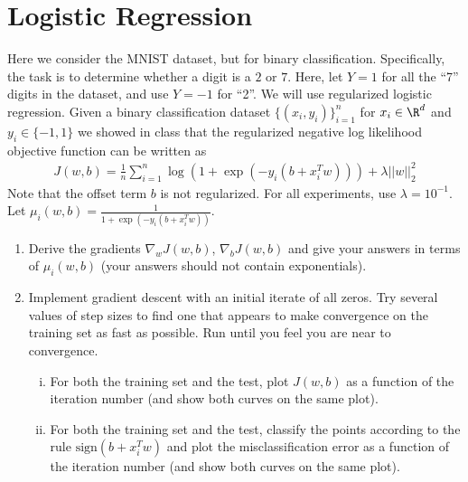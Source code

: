 \documentclass{article}
\begin{document}
\newpage

\section*{Logistic Regression}

\begin{aprob}
    Here we consider the MNIST dataset, but for binary classification. Specifically, the task is to determine whether a digit is a $2$ or $7$.
    Here, let $Y=1$ for all the ``7'' digits in the dataset, and use $Y=-1$ for ``2''.
    We will use regularized logistic regression. 
    Given a binary classification dataset $\{(x_i,y_i)\}_{i=1}^n$ for $x_i \in \R^d$ and $y_i \in \{-1,1\}$ we showed in class that the regularized negative log likelihood objective function can be written as
    \begin{align*}
    J(w,b) = \frac{1}{n} \sum_{i=1}^n \log( 1 + \exp(-y_i (b + x_i^T w))) + \lambda ||w||_2^2
    \end{align*} 
    Note that the offset term $b$ is not regularized. 
    For all experiments, use $\lambda = 10^{-1}$. 
    Let $\mu_i(w,b) = \frac{1}{1+ \exp(-y_i (b + x_i^T w))}$. 
    \begin{enumerate}
        \item {} Derive the gradients $\nabla_w J(w,b)$, $\nabla_{b} J(w,b)$ and give your answers in terms of $\mu_i(w,b)$ (your answers should not contain exponentials).
        \item {} Implement gradient descent with an initial iterate of all zeros. Try several values of step sizes to find one that appears to make convergence on the training set as fast as possible. Run until you feel you are near to convergence.
        \begin{enumerate}[(i)]
            \item For both the training set and the test, plot $J(w,b)$ as a function of the iteration number (and show both curves on the same plot).  
            \item For both the training set and the test, classify the points according to the rule $\text{sign}(b + x_i^T w)$ and plot the misclassification error as a function of the iteration number (and show both curves on the same plot). 
        \end{enumerate}
          

\end{enumerate}
\end{aprob}
\end{document}
